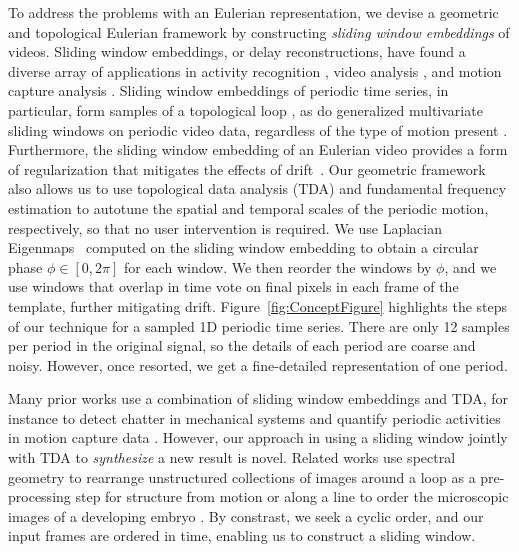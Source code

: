 \documentclass{article}
\begin{document}
To address the problems with an Eulerian representation, we devise a geometric and topological Eulerian framework by constructing {\em sliding window embeddings} of videos.  Sliding window embeddings, or delay reconstructions, have found a diverse array of applications in activity recognition \cite{frank2010activity,venkataraman2016shape}, video analysis \cite{tralie2017quasi}, and motion capture analysis \cite{venkataraman2016shape}.  Sliding window embeddings of periodic time series, in particular, form samples of a topological loop \cite{perea2015sliding}, as do generalized multivariate sliding windows on periodic video data, regardless of the type of motion present \cite{traliehigh, tralie2017quasi}.  Furthermore, the sliding window embedding of an Eulerian video provides a form of regularization that mitigates the effects of drift~\cite{tralie2017quasi}.  Our geometric framework also allows us to use topological data analysis (TDA) \cite{edelsbrunner2000topological,edelsbrunner2008persistent,edelsbrunner2010computational,carlsson2009topology,ghrist2014elementary} and fundamental frequency estimation \cite{Mcleod05asmarter} to autotune the spatial and temporal scales of the periodic motion, respectively, so that no user intervention is required.  We use Laplacian Eigenmaps~\cite{belkin2003laplacian} computed on the sliding window embedding to obtain a circular phase $\phi \in [0, 2\pi]$ for each window.  We then reorder the windows by $\phi$, and we use windows that overlap in time vote on final pixels in each frame of the template, further mitigating drift.  Figure~\ref{fig:ConceptFigure} highlights the steps of our technique for a sampled 1D periodic time series.  There are only 12 samples per period in the original signal, so the details of each period are coarse and noisy.  However, once resorted, we get a fine-detailed representation of one period.


Many prior works use a combination of sliding window embeddings and TDA, for instance to detect chatter in mechanical systems \cite{khasawneh2016chatter} and quantify periodic activities in motion capture data \cite{vejdemo2015cohomological, venkataraman2016persistent}. However, our approach in using a sliding window jointly with TDA to {\em synthesize} a new result is novel. Related works use spectral geometry to rearrange unstructured collections of images around a loop as a pre-processing step for structure from motion \cite{averbuch2015ringit} or along a line to order the microscopic images of a developing embryo \cite{dsilva2015diffusionvecordering}. By constrast, we seek a cyclic order, and our input frames are ordered in time, enabling us to construct a sliding window.
\end{document}
